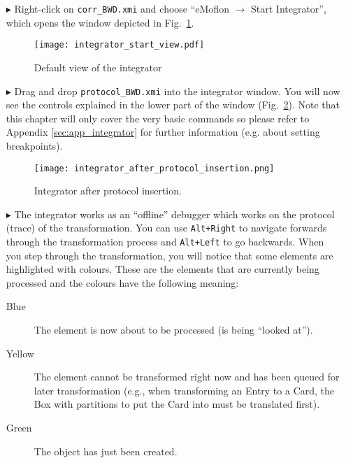 \begin{enumerate}


\item[$\blacktriangleright$] Right-click on \texttt{corr\_BWD.xmi} and choose ``eMoflon $\rightarrow$ Start Integrator'', which opens the window depicted in Fig.~\ref{fig:integrator_start}.

\begin{figure}[htbp]
\begin{center}
  \texttt{[image: integrator\_start\_view.pdf]}
  \caption{Default view of the integrator}
  \label{fig:integrator_start}
\end{center}
\end{figure}

\item[$\blacktriangleright$] Drag and drop \texttt{protocol\_BWD.xmi} into the integrator window. 
You will now see the controls explained in the lower part of the window 
(Fig.~\ref{fig:integrator_after_protocol}). 
Note that this chapter will only cover the very basic commands so please refer to 
Appendix \ref{sec:app_integrator} for further information (e.g. about setting breakpoints).

\begin{figure}[htbp]
\begin{center}
  \texttt{[image: integrator\_after\_protocol\_insertion.png]}
  \caption{Integrator after protocol insertion.}
  \label{fig:integrator_after_protocol}
\end{center}
\end{figure} 
\FloatBarrier

\item[$\blacktriangleright$] The integrator works as an ``offline'' debugger which works on the protocol 
(trace) of the transformation. 
You can use \texttt{Alt+Right} to navigate forwards through the transformation process and \texttt{Alt+Left} 
to go backwards. 
When you step through the transformation, you will notice that some elements are highlighted with colours. 
These are the elements that are currently being processed and the colours have the following meaning:
\begin{description}
  \item[Blue] The element is now about to be processed (is being ``looked at'').
  \item[Yellow] The element cannot be transformed right now and has been queued for later transformation 
  (e.g., when transforming an Entry to a Card, the Box with partitions to put the 
  Card into must be translated first).
  \item[Green] The object has just been created.
\end{description}
\end{enumerate}